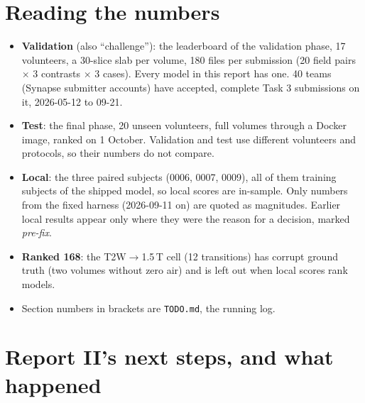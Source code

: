 \documentclass[10pt,a4paper]{article}
\begin{document}
\section{Reading the numbers}\label{sec:reading}

\begin{itemize}
  \item \textbf{Validation} (also ``challenge''): the leaderboard of the validation phase, 17
        volunteers, a 30-slice slab per volume, 180 files per submission (20 field pairs $\times$
        3 contrasts $\times$ 3 cases). Every model in this report has one. 40 teams (Synapse
        submitter accounts) have accepted, complete Task 3 submissions on it, 2026-05-12 to 09-21.
  \item \textbf{Test}: the final phase, 20 unseen volunteers, full volumes through a Docker image,
        ranked on 1 October. Validation and test use different volunteers and protocols, so their
        numbers do not compare.
  \item \textbf{Local}: the three paired subjects (0006, 0007, 0009), all of them training
        subjects of the shipped model, so local scores are in-sample. Only numbers from the fixed
        harness (2026-09-11 on) are quoted as magnitudes. Earlier local results appear only where
        they were the reason for a decision, marked \emph{pre-fix}.
  \item \textbf{Ranked 168}: the T2W$\to$1.5\,T cell (12 transitions) has corrupt ground truth
        (two volumes without zero air) and is left out when local scores rank models.
  \item Section numbers in brackets are \texttt{TODO.md}, the running log.
\end{itemize}

\section{Report II's next steps, and what happened}\label{sec:plans}
\end{document}
